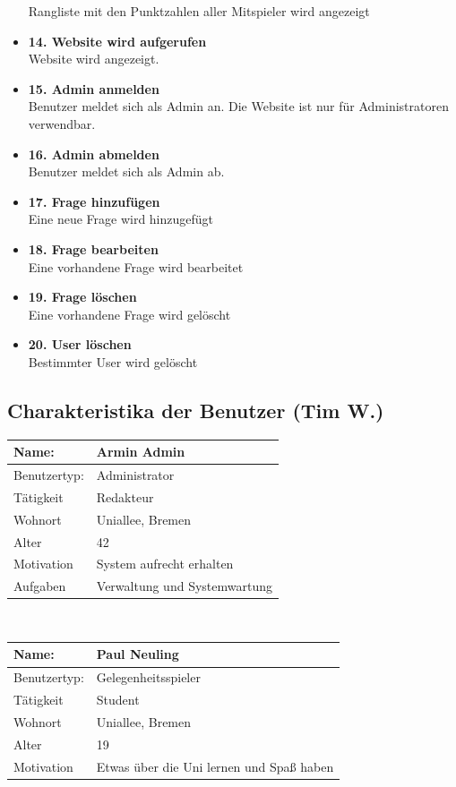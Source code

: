 \documentclass[fontsize=12pt,paper=a4,twoside]{scrartcl}
\begin{document}
\begin{itemize}
	Rangliste mit den Punktzahlen aller Mitspieler wird angezeigt
	\item \textbf{14. Website wird aufgerufen}\\
	Website wird angezeigt.
	\item \textbf{15. Admin anmelden}\\
	Benutzer meldet sich als Admin an. Die Website ist nur für Administratoren verwendbar.
	\item \textbf{16. Admin abmelden}\\
	Benutzer meldet sich als Admin ab.
	\item \textbf{17. Frage hinzufügen}\\
	Eine neue Frage wird hinzugefügt
	\item \textbf{18. Frage bearbeiten}\\
	Eine vorhandene Frage wird bearbeitet
	\item \textbf{19. Frage löschen}\\
	Eine vorhandene Frage wird gelöscht
	\item \textbf{20. User löschen}\\
	Bestimmter User wird gelöscht
\end{itemize}

\subsection{Charakteristika der Benutzer (Tim W.)}
	\begin{tabular}{|p{}|p{}|}\hline
       \textbf{Name:} &  \textbf{Armin Admin}\\\hline
       Benutzertyp: & Administrator\\\hline
       Tätigkeit	& Redakteur\\\hline
       Wohnort & Uniallee, Bremen\\\hline
       Alter	 & 42\\\hline
       Motivation & System aufrecht erhalten\\\hline
       Aufgaben & Verwaltung und Systemwartung\\\hline
    \end{tabular}\\
        
    	\begin{tabular}{|p{}|p{}|}\hline
        \textbf{Name:} &  \textbf{Paul Neuling}\\\hline
       Benutzertyp: & Gelegenheitsspieler \\\hline
       Tätigkeit	& Student\\\hline
       Wohnort & Uniallee, Bremen\\\hline
       Alter	 & 19\\\hline
       Motivation & Etwas über die Uni lernen und Spaß haben\\\hline
    \end{tabular}\\
    
\end{document}
